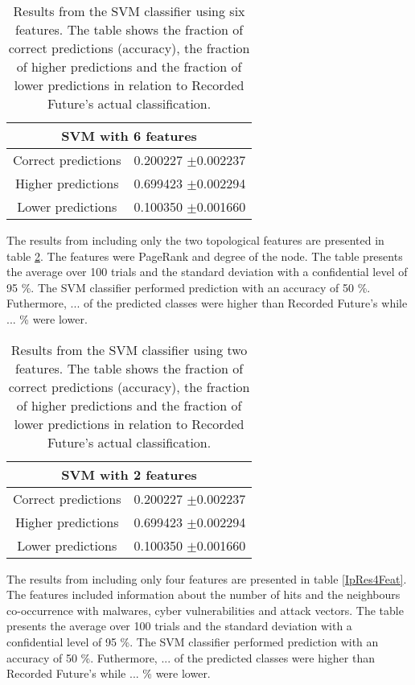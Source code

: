 \begin{table}[h!]
    \centering
    \caption{Results from the SVM classifier using six features. The table shows the fraction of correct predictions (accuracy), the fraction of higher predictions and the fraction of lower predictions in relation to Recorded Future's actual classification.}
    \begin{tabular}{|c|c|}
    \hline
        \multicolumn{2}{|c|}{SVM with 6 features}\\ \hline
        Correct predictions & 0.200227 $\pm$0.002237 \\
        Higher predictions  & 0.699423 $\pm$0.002294\\
        Lower predictions   & 0.100350 $\pm$0.001660\\ \hline
    \end{tabular}
    \label{IpRes}
\end{table}

The results from including only the two topological features are presented in table \ref{IpRes2Feat}. The features were PageRank and degree of the node. The table presents the average over 100 trials and the standard deviation with a confidential level of 95 \%. The SVM classifier performed prediction with an accuracy of 50 \%. Futhermore, ... of the predicted classes were higher than Recorded Future's while ... \% were lower. 

\begin{table}[h!]
    \centering
    \caption{Results from the SVM classifier using two features. The table shows the fraction of correct predictions (accuracy), the fraction of higher predictions and the fraction of lower predictions in relation to Recorded Future's actual classification.}
    \begin{tabular}{|c|c|}
    \hline
        \multicolumn{2}{|c|}{SVM with 2 features}\\ \hline
        Correct predictions & 0.200227 $\pm$0.002237 \\
        Higher predictions  & 0.699423 $\pm$0.002294\\
        Lower predictions   & 0.100350 $\pm$0.001660\\ \hline
    \end{tabular}
    \label{IpRes2Feat}
\end{table}

The results from including only four features are presented in table \ref{IpRes4Feat}. The features included information about the number of hits and the neighbours co-occurrence with malwares, cyber vulnerabilities and attack vectors. The table presents the average over 100 trials and the standard deviation with a confidential level of 95 \%. The SVM classifier performed prediction with an accuracy of 50 \%. Futhermore, ... of the predicted classes were higher than Recorded Future's while ... \% were lower. 

